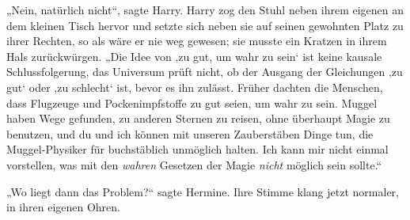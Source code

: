 „Nein, natürlich nicht“, sagte Harry. Harry zog den Stuhl neben ihrem eigenen an dem kleinen Tisch hervor und setzte sich neben sie auf seinen gewohnten Platz zu ihrer Rechten, so als wäre er nie weg gewesen; sie musste ein Kratzen in ihrem Hals zurückwürgen.
„Die Idee von ‚zu gut, um wahr zu sein‘ ist keine kausale Schlussfolgerung, das Universum prüft nicht, ob der Ausgang der Gleichungen ‚zu gut‘ oder ‚zu schlecht‘ ist, bevor es ihn zulässt. Früher dachten die Menschen, dass Flugzeuge und Pockenimpfstoffe zu gut seien, um wahr zu sein. Muggel haben Wege gefunden, zu anderen Sternen zu reisen, ohne überhaupt Magie zu benutzen, und du und ich können mit unseren Zauberstäben Dinge tun, die Muggel-Physiker für buchstäblich unmöglich halten. Ich kann mir nicht einmal vorstellen, was mit den \emph{wahren} Gesetzen der Magie \emph{nicht} möglich sein sollte.“

„Wo liegt dann das Problem?“ sagte Hermine. Ihre Stimme klang jetzt normaler, in ihren eigenen Ohren.

